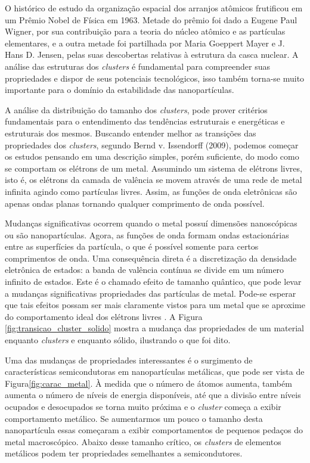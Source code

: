 O histórico de estudo da organização espacial dos arranjos atômicos frutificou em um Prêmio Nobel de Física em 1963. Metade do prêmio foi dado a Eugene Paul Wigner, por sua contribuição para a teoria do núcleo atômico e as partículas elementares,  e a outra metade foi partilhada por Maria Goeppert Mayer e J. Hans D. Jensen, pelas suas descobertas relativas à estrutura da casca nuclear. A análise das estruturas dos \textit{clusters} é fundamental para compreender suas propriedades e  dispor de seus potenciais tecnológicos, isso também torna-se muito importante para o domínio da estabilidade das nanopartículas. 


A análise da distribuição do tamanho dos \textit{clusters}, pode prover critérios fundamentais para o entendimento das tendências estruturais e energéticas e estruturais dos mesmos. Buscando entender melhor as transições das propriedades dos \textit{clusters}, segundo Bernd v. Issendorff (2009), podemos começar os estudos pensando em uma descrição simples, porém suficiente, do modo como se comportam os elétrons de um metal. Assumindo um sistema de elétrons livres, isto é, os elétrons da camada de valência se movem através de uma rede de metal infinita agindo como partículas livres. Assim, as funções de onda eletrônicas são apenas ondas planas tornando qualquer comprimento de onda possível.

Mudanças significativas ocorrem quando o metal possuí dimensões nanoscópicas ou são nanopartículas. Agora, as funções de onda formam ondas estacionárias entre as superfícies da partícula, o que é possível somente para certos comprimentos de onda. Uma consequência direta é a discretização da densidade eletrônica de estados: a banda de valência contínua se divide em um número infinito de estados. Este é o chamado efeito de tamanho quântico, que pode levar a mudanças significativas propriedades das partículas de metal. Pode-se esperar que tais efeitos possam ser mais claramente vistos para um metal que se aproxime do comportamento ideal dos elétrons livres \cite{capitulo_livro_shell}. A Figura \ref{fig:transicao_cluster_solido} mostra a mudança das propriedades de um material enquanto \textit{clusters} e enquanto sólido, ilustrando o que foi dito.

Uma das mudanças de propriedades interessantes é o surgimento de características semicondutoras em nanopartículas metálicas, que pode ser vista de Figura\ref{fig:carac_metal}. À medida que o número de átomos aumenta, também aumenta o número de níveis de energia disponíveis, até que a divisão entre níveis ocupados e desocupados se torna muito próxima e o \textit{cluster} começa a exibir comportamento metálico. Se aumentarmos um pouco o tamanho desta nanopartícula essas começaram a exibir comportamentos de pequenos pedaços do metal macroscópico. Abaixo desse tamanho crítico, os \textit{clusters} de elementos metálicos podem ter propriedades semelhantes a semicondutores.


